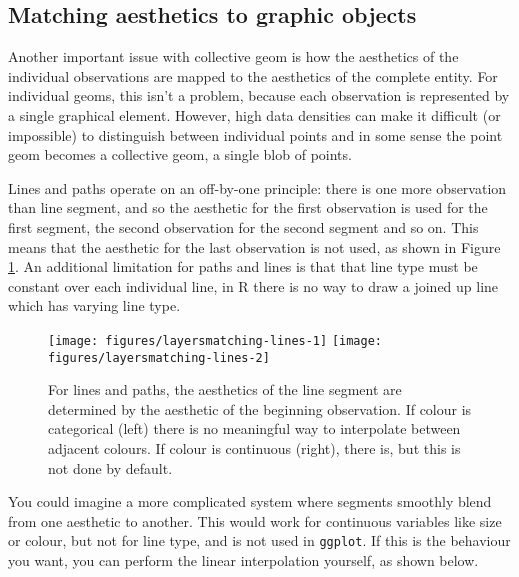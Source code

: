 \subsection{Matching aesthetics to graphic objects}\label{sub:matching}

Another important issue with collective geom is how the aesthetics of
the individual observations are mapped to the aesthetics of the complete
entity. For individual geoms, this isn't a problem, because each
observation is represented by a single graphical element. However, high
data densities can make it difficult (or impossible) to distinguish
between individual points and in some sense the point geom becomes a
collective geom, a single blob of points.

Lines and paths operate on an off-by-one principle: there is one more
observation than line segment, and so the aesthetic for the first
observation is used for the first segment, the second observation for
the second segment and so on. This means that the aesthetic for the last
observation is not used, as shown in Figure \ref{fig:matching-lines}. An
additional limitation for paths and lines is that that line type must be
constant over each individual line, in R there is no way to draw a
joined up line which has varying line type. 

\begin{figure}

{\centering \texttt{[image: figures/layersmatching-lines-1]} \texttt{[image: figures/layersmatching-lines-2]} 

}

\caption{For lines and paths, the aesthetics of the line segment are determined by the aesthetic of the beginning observation. If colour is categorical (left) there is no meaningful way to interpolate between adjacent colours. If colour is continuous (right), there is, but this is not done by default.\label{fig:matching-lines}}
\end{figure}

You could imagine a more complicated system where segments smoothly
blend from one aesthetic to another. This would work for continuous
variables like size or colour, but not for line type, and is not used in
\texttt{ggplot}. If this is the behaviour you want, you can perform the
linear interpolation yourself, as shown below.

